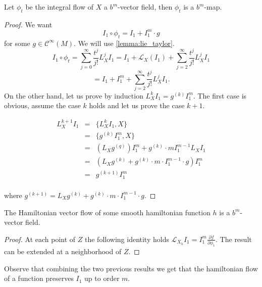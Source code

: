 \begin{lemma}
Let $\phi_t$ be the integral flow of $X$ a $b^m$-vector field, then $\phi_t$ is a $b^m$-map.
\end{lemma}
\begin{proof}
We want
$$I_1\circ \phi_t = I_1 + I_1^m\cdot g$$ for some $g\in \mathcal{C}^\infty(M)$.
We will use \ref{lemma:lie_taylor}.
$$I_1 \circ \phi_t = \sum_{j=0}^\infty \frac{t^j}{j!}L_X^j I_1 = I_1 + \mathcal{L}_X(I_1) + \sum_{j=2}^\infty\frac{t^j}{j!}L_X^j I_1$$
$$= I_1 +  I_1^m + \sum_{j=2}^\infty\frac{t^j}{j!}L_X^j I_1.$$
On the other hand, let us prove by induction $L_X^k I_1 = g^{(k)} I_1^m$. The first case is obvious, assume the case $k$ holds and let us prove the case $k+1$.

$$
\begin{array}{rcl}
L_X^{k+1} I_1 & = & \{L_X^k I_1, X\} \\
& = & \{g^{(k)} I_1^m, X\} \\
& = & (L_X g^{(q)}) I_1^m + g^{(k)}\cdot m I_1^{m-1}L_X I_1 \\
& = & (L_X g^{(k)} + g^{(k)}\cdot m \cdot I_1^{m-1}\cdot g) I_1^m \\
& = & g^{(k+1)} I_1^m \\
\end{array}
$$

where $g^{(k+1)} = L_X g^{(k)} + g^{(k)}\cdot m \cdot I_1^{m-1}\cdot g$.

\end{proof}

\begin{lemma}
The Hamiltonian vector flow of some smooth hamiltonian function $h$ is a $b^m$-vector field.
\end{lemma}
\begin{proof}
At each point of $Z$ the following identity holds $\mathcal{L}_{X_h} I_1 = I_1^m\frac{\partial f}{\partial \phi_1}$. The result can be extended at a neighborhood of $Z$.
\end{proof}

Observe that combining the two previous results we get that the hamiltonian flow of a function preserves $I_1$ up to order $m$.




